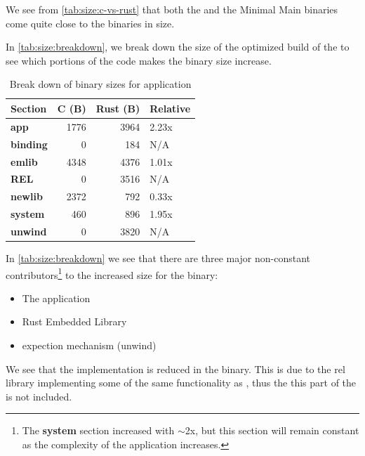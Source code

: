 We see from \autoref{tab:size:c-vs-rust} that both the {\cg} and the Minimal Main  {\rust} binaries come quite close to the {\C} binaries in size.

In \autoref{tab:size:breakdown}, we break down the size of the optimized build of the {\tracker} to see which portions of the {\rust} code makes the binary size increase.

\begin{table}[H]
  \centering
  \begin{tabular}{l|r|r|l}
    \textbf{Section}      & \textbf{C (B)} & \textbf{Rust (B)} & \textbf{Relative} \\
    \hline
    \textbf{app}          & 1776 & 3964 & 2.23x \\
    \textbf{binding}      & 0    & 184  & N/A  \\
    \textbf{emlib}        & 4348 & 4376 & 1.01x \\
    \textbf{REL}          & 0    & 3516 & N/A  \\
    \textbf{newlib}       & 2372 & 792  & 0.33x \\
    \textbf{system}       & 460  & 896  & 1.95x \\
    \textbf{unwind}       & 0    & 3820 & N/A  \\
    \hline
  \end{tabular}
  \caption{Break down of binary sizes for {\tracker} application}
  \label{tab:size:breakdown}
\end{table}

In \autoref{tab:size:breakdown} we see that there are three major non-constant contributors\footnote{The \textbf{system} section increased with $\sim$2x, but this section will remain constant as the complexity of the application increases.} to the increased size for the {\rust} binary:

\begin{itemize}
\item The application
\item Rust Embedded Library
\item {\rust} expection mechanism (unwind)
\end{itemize}

We see that the  implementation is reduced in the {\rust} binary.
This is due to the \gls{rel} library implementing some of the same functionality as , thus the this part of the  is not included.


